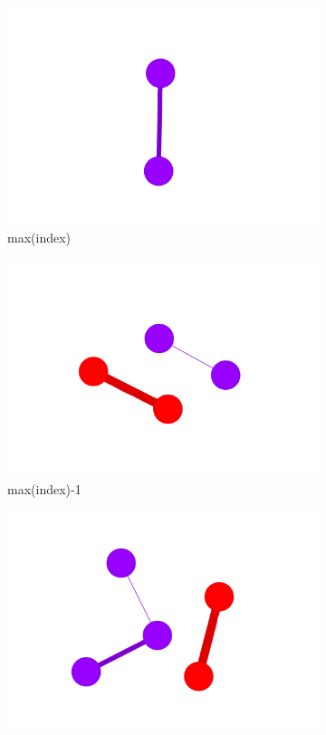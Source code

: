 \begin{figure}[!htb]
	\centering
	\begin{subfigure}[b]{0.13\linewidth}
		\includegraphics[width=\linewidth]{Minor Thesis/figures/graphs/sa/A.png}
		\caption{max(index)}
	\end{subfigure}
	\hfill
	\begin{subfigure}[b]{0.13\linewidth}
		\includegraphics[width=\linewidth]{Minor Thesis/figures/graphs/sa/B.png}
		\caption{max(index)-1}
	\end{subfigure}
	\hfill
	\begin{subfigure}[b]{0.13\linewidth}
		\includegraphics[width=\linewidth]{Minor Thesis/figures/graphs/sa/C.png}

\end{subfigure}
\end{figure}

